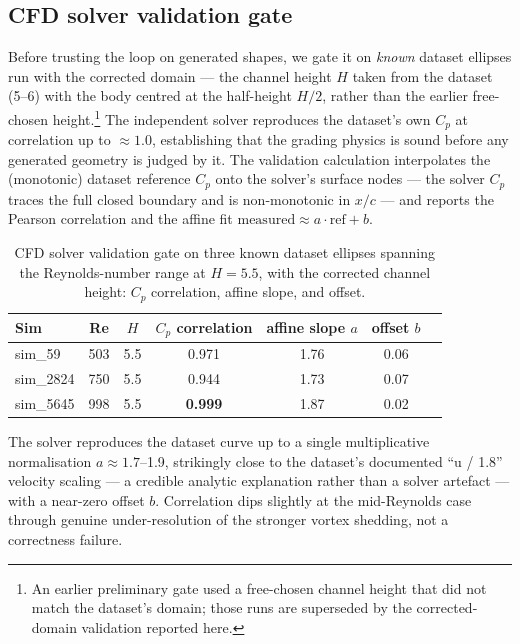 \subsection{CFD solver validation gate}
\label{sec:solver-gate}

Before trusting the loop on generated shapes, we gate it on \emph{known} dataset ellipses run with the
corrected domain --- the channel height $H$ taken from the dataset (5--6) with the body centred at the
half-height $H/2$, rather than the earlier free-chosen height.\footnote{An earlier preliminary gate
used a free-chosen channel height that did not match the dataset's domain; those runs are superseded by
the corrected-domain validation reported here.} The independent solver reproduces the
dataset's own $C_p$ at correlation up to $\approx 1.0$, establishing that the grading physics is sound
before any generated geometry is judged by it. The validation calculation interpolates the (monotonic)
dataset reference $C_p$ onto the solver's surface nodes --- the solver $C_p$ traces the full closed
boundary and is non-monotonic in $x/c$ --- and reports the Pearson correlation and the affine fit
$\mathrm{measured} \approx a\cdot\mathrm{ref} + b$.

\begin{table}[t]
  \centering
  \begin{tabular}{lcccccc}
    \toprule
    Sim & Re & $H$ & $C_p$ correlation & affine slope $a$ & offset $b$ \\
    \midrule
    sim\_59   & 503 & 5.5 & 0.971          & 1.76 & 0.06 \\
    sim\_2824 & 750 & 5.5 & 0.944          & 1.73 & 0.07 \\
    sim\_5645 & 998 & 5.5 & \textbf{0.999} & 1.87 & 0.02 \\
    \bottomrule
  \end{tabular}
  \caption{CFD solver validation gate on three known dataset ellipses spanning the Reynolds-number
  range at $H = 5.5$, with the corrected channel height: $C_p$ correlation, affine slope, and offset.}
  \label{tab:solver-gate}
\end{table}

The solver reproduces the dataset curve up to a single multiplicative normalisation $a \approx 1.7$--1.9,
strikingly close to the dataset's documented ``u / 1.8'' velocity scaling --- a credible analytic
explanation rather than a solver artefact --- with a near-zero offset $b$. Correlation dips slightly at
the mid-Reynolds case through genuine under-resolution of the stronger vortex shedding, not a
correctness failure.

